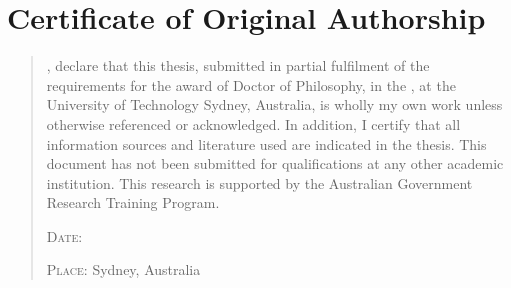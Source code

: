 \chapter*{Certificate of Original Authorship}

\begin{SingleSpace}
\begin{quote}
,  
\emph{\utsname} declare that this thesis, submitted in partial fulfilment of the requirements for
the award of Doctor of Philosophy, 
in the \emph{\utsschool}, 
\emph{\utsfaculty}
at the University of Technology Sydney, Australia, is wholly my own work unless otherwise referenced or acknowledged. 
In addition, I certify that all information sources and literature used are indicated in the thesis.
This document has not been submitted for qualifications at any other academic institution.
%
This research is supported by the Australian Government Research Training Program.

\noindent

\noindent
{}


\vspace{0.35cm}
\noindent 
\hspace{-0.75cm}\textsc{Date: } \DTMdate{\utsyear-\utsmonth-\utsday}

\noindent 
\hspace{-0.75cm}\textsc{Place: } Sydney, Australia

\end{quote}
\end{SingleSpace}
\clearpage
